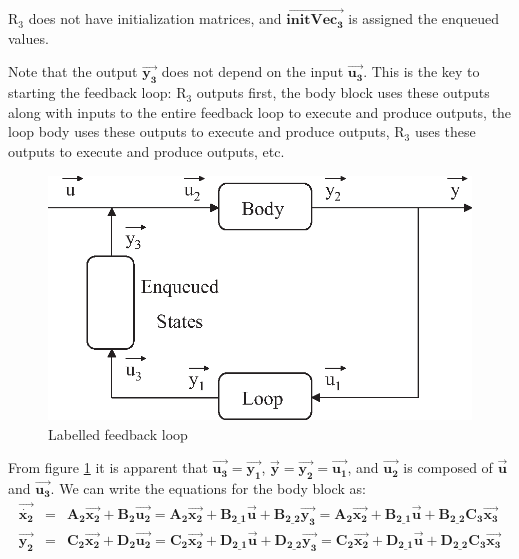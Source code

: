     $\mathrm{R_3}$ does not have initialization matrices, and
$\overrightarrow{\mathbf{initVec_3}}$ is assigned the enqueued
values.

    Note that the output $\vec{\mathbf{y_3}}$ does not depend on
the input $\vec{\mathbf{u_3}}$. This is the key to starting the
feedback loop: $\mathrm{R_3}$ outputs first, the body block uses
these outputs along with inputs to the entire feedback loop to
execute and produce outputs, the loop body uses these outputs to
execute and produce outputs, $\mathrm{R_3}$ uses these outputs to
execute and produce outputs, etc.

\begin{figure}[bthp]
  \centering
  \includegraphics[width=6.0in]{figures/feedback2.eps}
  \caption{Labelled feedback loop}
  \label{fig:feedback2}
\end{figure}

    From figure \ref{fig:feedback2} it is apparent that $\vec{\mathbf{u_3}} =
\vec{\mathbf{y_1}}$, $\vec{\mathbf{y}} = \vec{\mathbf{y_2}} =
\vec{\mathbf{u_1}}$, and $\vec{\mathbf{u_2}}$ is composed of
$\vec{\mathbf{u}}$ and $\vec{\mathbf{u_3}}$. We can write the
equations for the body block as:
\begin{eqnarray*}
\vec{\dot{\mathbf{x_2}}} & = & \mathbf{A_2} \vec{\mathbf{x_2}} +
\mathbf{B_2} \vec{\mathbf{u_2}} = \mathbf{A_2}\vec{\mathbf{x_2}} +
\mathbf{B_{2\_1}} \vec{\mathbf{u}} + \mathbf{B_{2\_2}}
\vec{\mathbf{y_3}} = \mathbf{A_2}\vec{\mathbf{x_2}} +
\mathbf{B_{2\_1}} \vec{\mathbf{u}} + \mathbf{B_{2\_2}}
\mathbf{C_3} \vec{\mathbf{x_3}} \\
\vec{\mathbf{y_2}} & = & \mathbf{C_2} \vec{\mathbf{x_2}} +
\mathbf{D_2} \vec{\mathbf{u_2}} = \mathbf{C_2}\vec{\mathbf{x_2}} +
\mathbf{D_{2\_1}} \vec{\mathbf{u}} + \mathbf{D_{2\_2}}
\vec{\mathbf{y_3}} = \mathbf{C_2}\vec{\mathbf{x_2}} +
\mathbf{D_{2\_1}} \vec{\mathbf{u}} + \mathbf{D_{2\_2}}
\mathbf{C_3} \vec{\mathbf{x_3}}
\end{eqnarray*}

